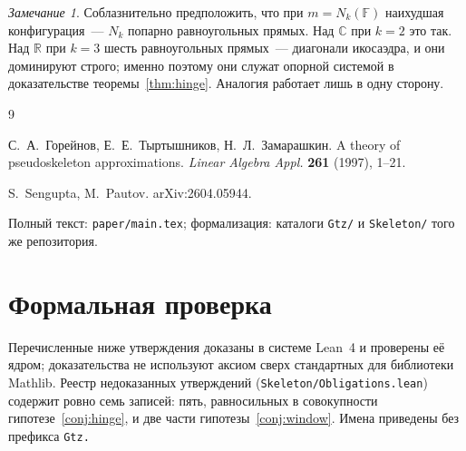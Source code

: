 \documentclass[11pt,a4paper]{article}
\theoremstyle{plain}
\theoremstyle{definition}
\theoremstyle{remark}
\newtheorem{remark}[theorem]{Замечание}
\newcommand{\RR}{\mathbb{R}}
\newcommand{\CC}{\mathbb{C}}
\newcommand{\FF}{\mathbb{F}}
\newcommand{\code}[1]{\texttt{\small #1}}
\begin{document}
\begin{remark}
Соблазнительно предположить, что при $m=N_k(\FF)$ наихудшая конфигурация~---
$N_k$ попарно равноугольных прямых. Над $\CC$ при $k=2$ это так. Над $\RR$ при
$k=3$ шесть равноугольных прямых~--- диагонали икосаэдра, и они доминируют
строго; именно поэтому они служат опорной системой в доказательстве
теоремы~\ref{thm:hinge}. Аналогия работает лишь в одну сторону.
\end{remark}

\begin{thebibliography}{9}

С.~А.~Горейнов, Е.~Е.~Тыртышников, Н.~Л.~Замарашкин.
A theory of pseudoskeleton approximations.
\emph{Linear Algebra Appl.} \textbf{261} (1997), 1--21.

S.~Sengupta, M.~Pautov. arXiv:2604.05944.

Полный текст: \code{paper/main.tex}; формализация: каталоги \code{Gtz/}
и \code{Skeleton/} того же репозитория.

\end{thebibliography}

\appendix
\section{Формальная проверка}\label{app:lean}

Перечисленные ниже утверждения доказаны в системе Lean~4 и проверены её
ядром; доказательства не используют аксиом сверх стандартных для
библиотеки Mathlib. Реестр недоказанных утверждений
(\code{Skeleton/Obligations.lean}) содержит ровно семь записей: пять,
равносильных в совокупности гипотезе~\ref{conj:hinge}, и две части
гипотезы~\ref{conj:window}. Имена приведены без префикса \code{Gtz.}
\end{document}
